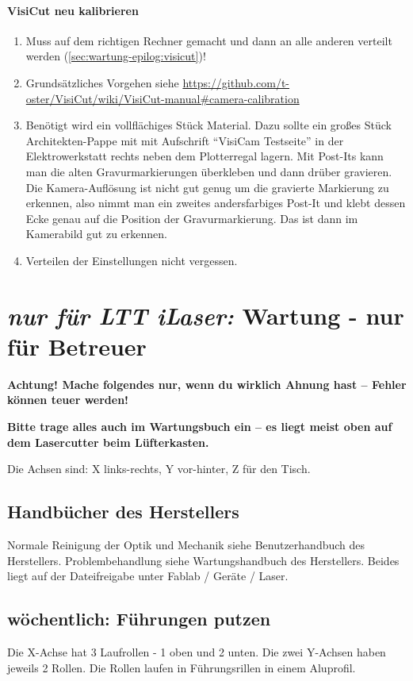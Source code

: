 \documentclass{\basedir/fablab-document}
\newcommand{\nurLTT}{\emph{nur für LTT iLaser:} }
\begin{document}
	\paragraph{VisiCut neu kalibrieren}
	\begin{enumerate}
		\item Muss auf dem richtigen Rechner gemacht und dann an alle anderen verteilt werden (\cref{sec:wartung-epilog:visicut})!
		\item Grundsätzliches Vorgehen siehe \url{https://github.com/t-oster/VisiCut/wiki/VisiCut-manual#camera-calibration}
		\item Benötigt wird ein vollflächiges Stück Material. Dazu sollte ein großes Stück Architekten-Pappe mit mit Aufschrift \enquote{VisiCam Testseite} in der Elektrowerkstatt rechts neben dem Plotterregal lagern.  Mit Post-Its kann man die alten Gravurmarkierungen überkleben und dann drüber gravieren. Die Kamera-Auflösung ist nicht gut genug um die gravierte Markierung zu erkennen, also nimmt man ein zweites andersfarbiges Post-It und klebt dessen Ecke genau auf die Position der Gravurmarkierung. Das ist dann im Kamerabild gut zu erkennen.
		\item Verteilen der Einstellungen nicht vergessen.
	\end{enumerate}


	\section{\nurLTT Wartung - nur für Betreuer}
	\label{sec:wartung-ltt}
	\textbf{Achtung! Mache folgendes nur, wenn du wirklich Ahnung hast -- Fehler können teuer werden!}
	
	\textbf{Bitte trage alles auch im Wartungsbuch ein -- es liegt meist oben auf dem Lasercutter beim Lüfterkasten.}

	Die Achsen sind: X links-rechts, Y vor-hinter, Z für den Tisch.

	\subsection{Handbücher des Herstellers}
	Normale Reinigung der Optik und Mechanik siehe Benutzerhandbuch des Herstellers. Problembehandlung siehe Wartungshandbuch des Herstellers. Beides liegt auf der Dateifreigabe unter Fablab / Geräte / Laser.

	\subsection{wöchentlich: Führungen putzen}
	Die X-Achse hat 3 Laufrollen - 1 oben und 2 unten. Die zwei Y-Achsen haben jeweils 2 Rollen. Die Rollen laufen in Führungsrillen in einem Aluprofil.
\end{document}
